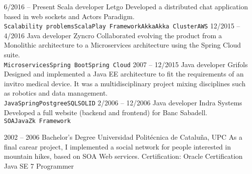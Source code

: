 \documentclass[9pt]{developercv} %
\begin{document}
\begin{entrylist}
	\entry
		{6/2016 -- Present}
		{Scala developer}
		{Letgo}
		{Developed a distributed chat application based in web sockets and Actors Paradigm.\\ \texttt{Scalability problems}\slashsep\texttt{Scala}\slashsep\texttt{Play Framework}\slashsep\texttt{Akka}\slashsep\texttt{Akka Cluster}\slashsep\texttt{AWS}}
	\entry
		{12/2015 -- 4/2016}
		{Java developer}
		{Zyncro}
		{Collaborated evolving the product from a Monolithic architecture to a Microservices architecture using the Spring Cloud suite.\\ \texttt{Microservices}\slashsep\texttt{Spring Boot}\slashsep\texttt{Spring Cloud}}
	\entry
		{2007 -- 12/2015}
		{Java developer}
		{Grifols}
		{Designed and implemented a Java EE architecture to fit the requirements of an invitro medical device. It was a multidisciplinary project mixing disciplines such as robotics and data management.\\ \texttt{Java}\slashsep\texttt{Spring}\slashsep\texttt{PostgreeSQL}\slashsep\texttt{SOLID}}
	\entry
		{2/2006 -- 12/2006}
		{Java developer}
		{Indra Systems}
		{Developed a full website (backend and frontend) for Banc Sabadell.\\ \texttt{SOA}\slashsep\texttt{Java}\slashsep\texttt{Zk Framework}}
\end{entrylist}



\begin{entrylist}
	\entry
		{2002 -- 2006}
		{Bachelor's Degree}
		{Universidad Politécnica de Cataluña, UPC}
		{As a final carear project, I implemented a social network for people interested in mountain hikes, based on SOA Web services.}
	\entry
		{}
		{Certification: Oracle Certification Java SE 7 Programmer}
		{}
		{}
\end{entrylist}

\end{document}
